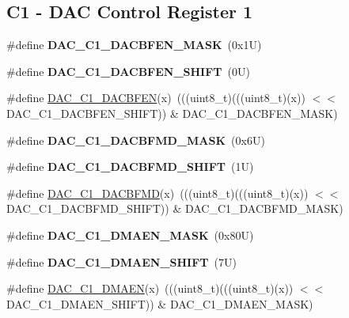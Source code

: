 \subsection*{C1 -\/ D\+AC Control Register 1}
\begin{DoxyCompactItemize}
\item 
\mbox{\label{group___d_a_c___register___masks_ga61aa82d21d0c84ff4fe42d0856c506bd}} 
\#define {\bfseries D\+A\+C\+\_\+\+C1\+\_\+\+D\+A\+C\+B\+F\+E\+N\+\_\+\+M\+A\+SK}~(0x1\+U)
\item 
\mbox{\label{group___d_a_c___register___masks_ga2062351429a9e737c0ac434488b59fe4}} 
\#define {\bfseries D\+A\+C\+\_\+\+C1\+\_\+\+D\+A\+C\+B\+F\+E\+N\+\_\+\+S\+H\+I\+FT}~(0\+U)
\item 
\#define \mbox{\hyperlink{group___d_a_c___register___masks_ga49da018be97202b42f8ffc39d5aaa848}{D\+A\+C\+\_\+\+C1\+\_\+\+D\+A\+C\+B\+F\+EN}}(x)~(((uint8\+\_\+t)(((uint8\+\_\+t)(x)) $<$$<$ D\+A\+C\+\_\+\+C1\+\_\+\+D\+A\+C\+B\+F\+E\+N\+\_\+\+S\+H\+I\+FT)) \& D\+A\+C\+\_\+\+C1\+\_\+\+D\+A\+C\+B\+F\+E\+N\+\_\+\+M\+A\+SK)
\item 
\mbox{\label{group___d_a_c___register___masks_ga28373e4d9ae322da4f6a37933a340b78}} 
\#define {\bfseries D\+A\+C\+\_\+\+C1\+\_\+\+D\+A\+C\+B\+F\+M\+D\+\_\+\+M\+A\+SK}~(0x6\+U)
\item 
\mbox{\label{group___d_a_c___register___masks_ga779629844ed0967b310e7f2721c54624}} 
\#define {\bfseries D\+A\+C\+\_\+\+C1\+\_\+\+D\+A\+C\+B\+F\+M\+D\+\_\+\+S\+H\+I\+FT}~(1\+U)
\item 
\#define \mbox{\hyperlink{group___d_a_c___register___masks_gabfcb0420c4e52f927d23e6c28554d648}{D\+A\+C\+\_\+\+C1\+\_\+\+D\+A\+C\+B\+F\+MD}}(x)~(((uint8\+\_\+t)(((uint8\+\_\+t)(x)) $<$$<$ D\+A\+C\+\_\+\+C1\+\_\+\+D\+A\+C\+B\+F\+M\+D\+\_\+\+S\+H\+I\+FT)) \& D\+A\+C\+\_\+\+C1\+\_\+\+D\+A\+C\+B\+F\+M\+D\+\_\+\+M\+A\+SK)
\item 
\mbox{\label{group___d_a_c___register___masks_ga091be41dfd851b71978ab7298c372292}} 
\#define {\bfseries D\+A\+C\+\_\+\+C1\+\_\+\+D\+M\+A\+E\+N\+\_\+\+M\+A\+SK}~(0x80\+U)
\item 
\mbox{\label{group___d_a_c___register___masks_ga481f558223c5c36402bebe924bdd00a3}} 
\#define {\bfseries D\+A\+C\+\_\+\+C1\+\_\+\+D\+M\+A\+E\+N\+\_\+\+S\+H\+I\+FT}~(7\+U)
\item 
\#define \mbox{\hyperlink{group___d_a_c___register___masks_gaa0c71561092dc89347f54d470e2924f0}{D\+A\+C\+\_\+\+C1\+\_\+\+D\+M\+A\+EN}}(x)~(((uint8\+\_\+t)(((uint8\+\_\+t)(x)) $<$$<$ D\+A\+C\+\_\+\+C1\+\_\+\+D\+M\+A\+E\+N\+\_\+\+S\+H\+I\+FT)) \& D\+A\+C\+\_\+\+C1\+\_\+\+D\+M\+A\+E\+N\+\_\+\+M\+A\+SK)
\end{DoxyCompactItemize}

